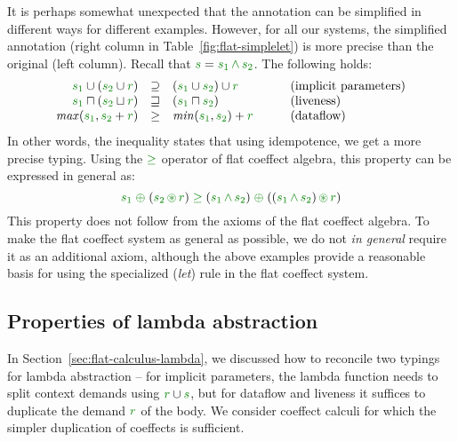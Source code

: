 It is perhaps somewhat unexpected that the annotation can be simplified in different ways for
different examples. However, for all our systems, the simplified annotation (right column in
Table~\ref{fig:flat-simplelet}) is more precise than the original (left column). Recall that
$\cclrd{s} = \cclrd{s_1}\,\czip\,\cclrd{s_2}$. The following holds:
%
\begin{equation*}
\begin{array}{rclll}
\cclrd{s_1} \cup (\cclrd{s_2} \cup \cclrd{r}) &\supseteq& (\cclrd{s_1} \cup \cclrd{s_2}) \cup \cclrd{r}
  && \textnormal{(implicit parameters)}\\
\cclrd{s_1} \sqcap (\cclrd{s_2} \sqcup \cclrd{r}) &\sqsupseteq&  (\cclrd{s_1} \sqcap \cclrd{s_2})
  && \textnormal{(liveness)} \\
\mathit{max}(\cclrd{s_1}, \cclrd{s_2} + \cclrd{r}) &\geq& \mathit{min}(\cclrd{s_1}, \cclrd{s_2}) + \cclrd{r}
  &\quad& \textnormal{(dataflow)} \\
\end{array}
\end{equation*}
%
In other words, the inequality states that using idempotence, we get a more precise typing.
Using the $\cgeq$ operator of flat coeffect algebra, this property can be expressed in general as:
%
\begin{equation*}
\cclrd{s_1} \;\cpar\; (\cclrd{s_2} \,\cseq\, \cclrd{r}) \;\cgeq\;
  (\cclrd{s_1} \,\czip\, \cclrd{s_2}) \;\cpar\; ((\cclrd{s_1} \,\czip\, \cclrd{s_2}) \,\cseq\, \cclrd{r})
\end{equation*}
%
This property does not follow from the axioms of the flat coeffect algebra. To make
the flat coeffect system as general as possible, we do not \emph{in general} require it as
an additional axiom, although the above examples provide a reasonable basis for using
the specialized (\emph{let}) rule in the flat coeffect system.


\subsection{Properties of lambda abstraction}
\label{sec:flat-exts-lambda}

In Section~\ref{sec:flat-calculus-lambda}, we discussed how to reconcile two typings for
lambda abstraction -- for implicit parameters, the lambda function needs to split context
demands using $\cclrd{r} \cup \cclrd{s}$, but for dataflow and liveness it suffices to
duplicate the demand $\cclrd{r}$ of the body. We consider coeffect calculi for which the
simpler duplication of coeffects is sufficient.

